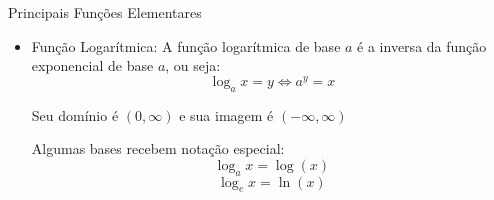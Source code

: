 \documentclass[hyperref={pdfpagelabels=false}]{beamer}
\begin{document}
\begin{frame}{Principais Funções Elementares}
 \begin{itemize}
   \item Função Logarítmica: \pause A função logarítmica de base $a$ é a inversa da função exponencial de base $a$, ou seja:
$$\log_{a}x = y \Leftrightarrow a^{y} = x$$ \pause

Seu domínio é $(0, \infty)$ e sua imagem é $(- \infty, \infty)$ \pause

Algumas bases recebem notação especial:
$$\log_{a}x = \log(x)$$
$$\log_{e}x = \ln(x)$$
 \end{itemize}

\end{frame}
\end{document}
